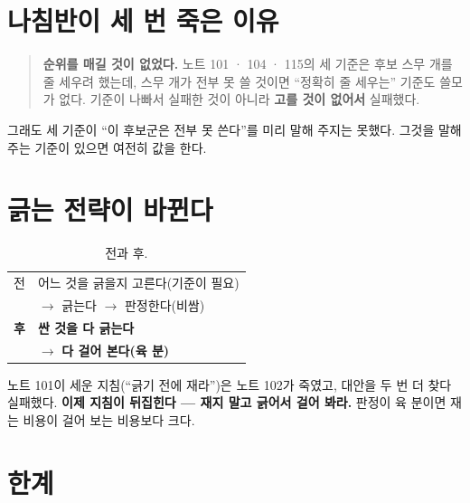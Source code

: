 \documentclass[10pt]{article}
\begin{document}

\section{나침반이 세 번 죽은 이유}

\begin{quote}\fontsize{9.5}{11.5}\selectfont
\textbf{순위를 매길 것이 없었다.} 노트 101 · 104 · 115의 세 기준은 후보
스무 개를 줄 세우려 했는데, 스무 개가 전부 못 쓸 것이면 ``정확히 줄 세우는''
기준도 쓸모가 없다. 기준이 나빠서 실패한 것이 아니라 \textbf{고를 것이
없어서} 실패했다.
\end{quote}

{그래도 세 기준이 ``이 후보군은 전부 못 쓴다''를 미리 말해 주지는 못했다.
그것을 말해 주는 기준이 있으면 여전히 값을 한다.}

\section{긁는 전략이 바뀐다}

\begin{table}[t]
\centering\tsize
\caption{전과 후.}
\begin{tabular}{ll}
\toprule
전 & 어느 것을 긁을지 고른다(기준이 필요) \\
& $\to$ 긁는다 $\to$ 판정한다(비쌈) \\
\midrule
\textbf{후} & \textbf{싼 것을 다 긁는다} \\
& $\to$ \textbf{다 걸어 본다(육 분)} \\
\bottomrule
\end{tabular}
\end{table}

노트 101이 세운 지침(``긁기 전에 재라'')은 노트 102가 죽였고, 대안을 두 번 더
찾다 실패했다. \textbf{이제 지침이 뒤집힌다 --- 재지 말고 긁어서 걸어 봐라.}
판정이 육 분이면 재는 비용이 걸어 보는 비용보다 크다.

\section{한계}
\end{document}

